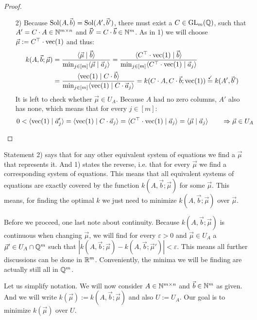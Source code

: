 \begin{proof}
\begin{enumerate}
        \item[2)] Because $\operatorname{Sol}(A, \vec b) = \operatorname{Sol}(A', \vec b')$, there must exist a $C \in \operatorname{GL}_m(\mathbb{Q})$, such that $A' = C \cdot A \in \mathbb{N}^{m \times n}$ and $\vec b' = C \cdot \vec b \in \mathbb{N}^m$. As in 1) we will choose $\vec \mu := C^\top \cdot \operatorname{vec}(1)$ and thus:
        \begin{align*}
            k(A, \vec b; \vec\mu) &= \frac{\langle \vec\mu \mid \vec b \rangle}{\min_{j\in [m]}\langle \vec\mu \mid \vec a_j \rangle} = \frac{\langle C^\top\cdot\operatorname{vec}(1) \mid \vec b \rangle}{\min_{j\in [m]}\langle C^\top\cdot\operatorname{vec}(1) \mid \vec a_j \rangle}\\
            &= \frac{\langle \operatorname{vec}(1) \mid C\cdot\vec b \rangle}{\min_{j\in [m]}\langle \operatorname{vec}(1) \mid C\cdot\vec a_j \rangle} = k(C\cdot A, C\cdot\vec b; \operatorname{vec}(1)) \stackrel{\checkmark}{=} k(A', \vec b')
        \end{align*}
        It is left to check whether $\vec \mu \in U_A$. Because $A$ had no zero columns, $A'$ also has none, which means that for every $j \in [m]$:
        \begin{equation*}
            0 < \langle \operatorname{vec}(1) \mid \vec a'_j \rangle = \langle \operatorname{vec}(1) \mid C \cdot \vec a_j \rangle = \langle C^\top \cdot \operatorname{vec}(1) \mid \vec a_j \rangle = \langle \vec \mu \mid \vec a_j \rangle \qquad \Rightarrow\vec \mu \in U_A \qedhere
        \end{equation*}

    \end{enumerate}
\end{proof}

Statement 2) says that for any other equivalent system of equations we find a $\vec \mu$ that represents it. And 1) states the reverse, i.e. that for every $\vec \mu$ we find a corresponding system of equations. This means that all equivalent systems of equations are exactly covered by the function $k(A, \vec b; \vec\mu)$ for some $\vec \mu$. This means, for finding the optimal $k$ we just need to minimize $k(A, \vec b; \vec \mu)$ over $\vec \mu$.

Before we proceed, one last note about continuity. Because $k(A, \vec b; \vec \mu)$ is continuous when changing $\vec\mu$, we will find for every $\varepsilon > 0$ and $\vec\mu \in U_A$ a $\vec\mu' \in U_A \cap \mathbb{Q}^m$ such that $|k(A, \vec b; \vec \mu) - k(A, \vec b; \vec \mu')| < \varepsilon$. This means all further discussions can be done in $\mathbb{R}^m$. Conveniently, the minima we will be finding are actually still all in $\mathbb{Q}^m$.

Let us simplify notation. We will now consider $A \in \mathbb{N}^{m \times n}$ and $\vec b \in \mathbb{N}^m$ as given. And we will write $k(\vec \mu) := k(A, \vec b; \vec \mu)$ and also $U := U_A$. Our goal is to minimize $k(\vec \mu)$ over $U$.

